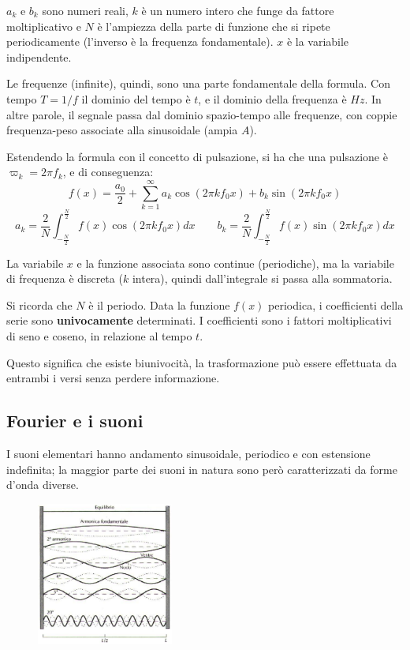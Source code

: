 $a_k$ e $b_k$ sono numeri reali, $k$ è un numero intero che funge da fattore moltiplicativo e $N$ è l'ampiezza della parte di funzione che si ripete periodicamente (l'inverso è la frequenza fondamentale). $x$ è la variabile indipendente.

Le frequenze (infinite), quindi, sono una parte fondamentale della formula. Con tempo $T = 1/f$ il dominio del tempo è $t$, e il dominio della frequenza è $Hz$. In altre parole, il segnale passa dal dominio spazio-tempo alle frequenze, con coppie frequenza-peso associate alla sinusoidale (ampia $A$).

Estendendo la formula con il concetto di pulsazione, si ha che una pulsazione è $\varpi_k = 2\pi f_k$, e di conseguenza:
$$f(x) = \frac{a_0}{2} + \sum_{k=1}^{\infty} a_k \cos(2\pi kf_0x) + b_k\sin(2\pi kf_0x)$$
$$a_k = \frac{2}{N} \int_{-\frac{N}{2}}^{\frac{N}{2}} f(x)\cos(2\pi kf_0x) dx \qquad b_k = \frac{2}{N} \int_{-\frac{N}{2}}^{\frac{N}{2}} f(x)\sin(2\pi kf_0x) dx$$

La variabile $x$ e la funzione associata sono continue (periodiche), ma la variabile di frequenza è discreta ($k$ intera), quindi dall'integrale si passa alla sommatoria.

Si ricorda che $N$ è il periodo. Data la funzione $f(x)$ periodica, i coefficienti della serie sono \textbf{univocamente} determinati. I coefficienti sono i fattori moltiplicativi di seno e coseno, in relazione al tempo $t$.

Questo significa che esiste biunivocità, la trasformazione può essere effettuata da entrambi i versi senza perdere informazione.

\subsection{Fourier e i suoni}
I suoni elementari hanno andamento sinusoidale, periodico e con estensione indefinita; la maggior parte dei suoni in natura sono però caratterizzati da forme d'onda diverse.

\begin{figure}
	\vspace{-15pt}
	\begin{center}
		\includegraphics[width=0.4\textwidth]{Lezioni/Immagini/armoniche}
	\end{center}
	\vspace{-40pt}
\end{figure}

